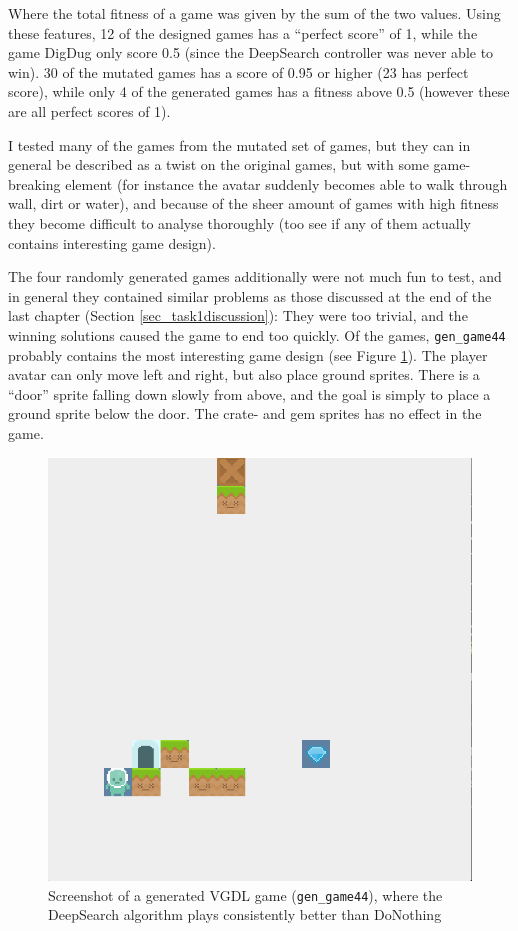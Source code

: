 \documentclass[a4paper,titlepage,final]{report}
\begin{document}
Where the total fitness of a game was given by the sum of the two values.
Using these features, 12 of the designed games has a ``perfect score'' of 1, while the game DigDug only score 0.5 (since the DeepSearch controller was never able to win).
30 of the mutated games has a score of 0.95 or higher (23 has perfect score), while only 4 of the generated games has a fitness above 0.5 (however these are all perfect scores of 1).

I tested many of the games from the mutated set of games, but they can in general be described as a twist on the original games, but with some game-breaking element (for instance the avatar suddenly becomes able to walk through wall, dirt or water), and because of the sheer amount of games with high fitness they become difficult to analyse thoroughly (too see if any of them actually contains interesting game design).

The four randomly generated games additionally were not much fun to test, and in general they contained similar problems as those discussed at the end of the last chapter (Section \ref{sec_task1discussion}): They were too trivial, and the winning solutions caused the game to end too quickly.
Of the games, \texttt{gen_game44} probably contains the most interesting game design (see Figure \ref{fig:gengame44}).
The player avatar can only move left and right, but also place ground sprites. 
There is a ``door'' sprite falling down slowly from above, and the goal is simply to place a ground sprite below the door.
The crate- and gem sprites has no effect in the game.

\begin{figure}[!ht]
\centering
\includegraphics[scale=0.24]{gengame44.png}
\caption{Screenshot of a generated VGDL game (\texttt{gen_game44}), where the DeepSearch algorithm plays consistently better than DoNothing}
\label{fig:gengame44}
\end{figure}
\end{document}
